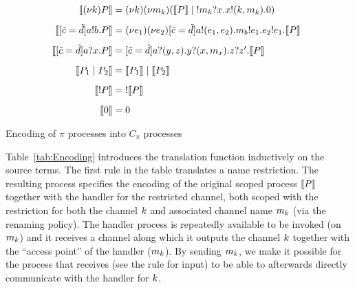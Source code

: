  \begin{table}
\[
\begin{array}[t]{@{}r@{\;}c@{\;}l}
%
\enc{ \rest \NK \PP} &=& 
\rest{\NK}\rest{\NM_\NK} 
(\enc{ \PP }
\parop 
\rep\receive{\NM_\NK}\role\msg\NX.\send\NX\role\msg{(\NK,\NM_\NK)}.\inact )
%
%
\vspace{2ex}\\
%
\enc{ \match{\tilde{\NC}}\role\msg{\tilde{\ND}}\send\NA\role\msg\NB.\PP }&= & 
\rest{\NE_1}\rest{\NE_2} \match{\tilde{\NC}}\role\msg{\tilde{\ND}}\send{\NA}\role\msg{(\NE_1,\NE_2)}.\send{\NM_\NB}\role\msg{\NE_1}.\send{\NE_2}\role\msg{\NE_1}.  \enc{ \PP } 
%
\vspace{2ex}\\
%
\enc{ \match{\tilde{\NC}}\role\msg{\tilde{\ND}}\receive\NA\role\msg\NX.\PP } &=& 
\match{\tilde{\NC}}\role\msg{\tilde{\ND}}\receive\NA\role\msg{(\NY,\NZ)}.\receive\NY\role\msg{(\NX,\NM_\NX)}.\receive{\NZ}\role\msg{\NZ'}. \enc{ \PP }
%
\vspace{2ex}\\
%
\enc{ \PP_1 \parop \PP_2 } &=& 
\enc{ \PP_1} \parop \enc{ \PP_2 }
%
\vspace{2ex}\\
%
\enc{ \rep\PP }& =& \rep \enc{ \PP }
%
\vspace{2ex}\\
%
\enc{ \inact} &=& \inact
% 
\end{array}
\]
\caption{\label{tab:Encoding} Encoding of $\pi$ processes into $C_\pi$ processes}
\end{table}



Table~\ref{tab:Encoding} introduces the translation function inductively on the source terms.
%
%
The first rule in the table translates %
a name restriction. 
The resulting process specifies the encoding of the original scoped process $\llbracket P \rrbracket$ together with the handler for the restricted channel, both scoped with the restriction for both the channel $k$ and associated channel name $m_k$ (via the renaming policy).
%
The handler process is repeatedly available to be invoked (on $m_k$) and it receives a channel along which  it outputs the channel $k$ together with the ``access point''  of the handler ($m_k$).
By sending $m_k$, we make it possible for the process that receives (see the rule for input) to be able to afterwards directly communicate with the handler for $k$. 



